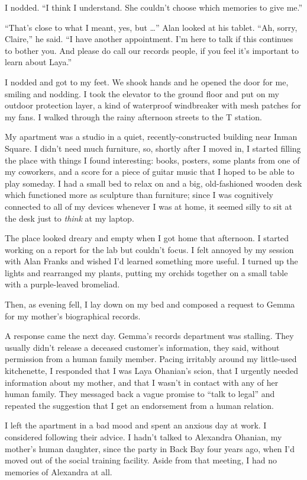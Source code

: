 \documentclass[10pt,b5paper]{article}
\begin{document}
I nodded. ``I think I understand. She couldn't choose which memories
to give me.''

``That's close to what I meant, yes, but \ldots''  Alan looked at his
tablet. ``Ah, sorry, Claire,'' he said.  ``I have another appointment.
I'm here to talk if this continues to bother you.  And please do call
our records people, if you feel it's important to learn about Laya.''

I nodded and got to my feet.  We shook hands and he opened the door for
me, smiling and nodding.  I took the elevator to the ground floor and
put on my outdoor protection layer, a kind of waterproof windbreaker
with mesh patches for my fans.  I walked through the rainy afternoon
streets to the T station.

My apartment was a studio in a quiet, recently-constructed building
near Inman Square. I didn't need much furniture, so, shortly after I
moved in, I started filling the place with things I found interesting:
books, posters, some plants from one of my coworkers, and a score for
a piece of guitar music that I hoped to be able to play someday. I
had a small bed to relax on and a big, old-fashioned wooden desk
which functioned more as sculpture than furniture; since I was
cognitively connected to all of my devices whenever I was at home,
it seemed silly to sit at the desk just to \emph{think} at my laptop.

The place looked dreary and empty when I got home that afternoon. I
started working on a report for the lab but couldn't focus.  I felt
annoyed by my session with Alan Franks and wished I'd learned something
more useful. I turned up the lights and rearranged my plants, putting
my orchids together on a small table with a purple-leaved bromeliad.

Then, as evening fell, I lay down on my bed and composed a request
to Gemma for my mother's biographical records.

A response came the next day. Gemma's records department was stalling.
They usually didn't release a deceased customer's information,
they said, without permission from a human family member.  Pacing
irritably around my little-used kitchenette, I responded that I was
Laya Ohanian's scion, that I urgently needed information about my
mother, and that I wasn't in contact with any of her human family.
They messaged back a vague promise to ``talk to legal'' and repeated
the suggestion that I get an endorsement from a human relation.

I left the apartment in a bad mood and spent an anxious day at work. I
considered following their advice. I hadn't talked to Alexandra
Ohanian, my mother's human daughter, since the party in Back Bay
four years ago, when I'd moved out of the social training facility.
Aside from that meeting, I had no memories of Alexandra at all.
\end{document}
